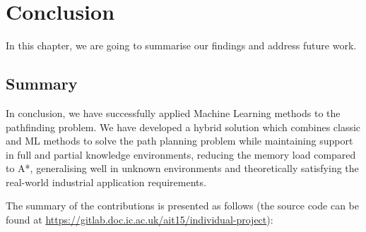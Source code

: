 \chapter{Conclusion} \label{Conclusion}


In this chapter, we are going to summarise our findings and address future work.

\section{Summary}

In conclusion, we have successfully applied Machine Learning methods to the pathfinding problem. We have developed a hybrid solution which combines classic and ML methods to solve the path planning problem while maintaining support in full and partial knowledge environments, reducing the memory load compared to A*, generalising well in unknown environments and theoretically satisfying the real-world industrial application requirements.


The summary of the contributions is presented as follows (the source code can be found at \url{https://gitlab.doc.ic.ac.uk/ait15/individual-project}): 

